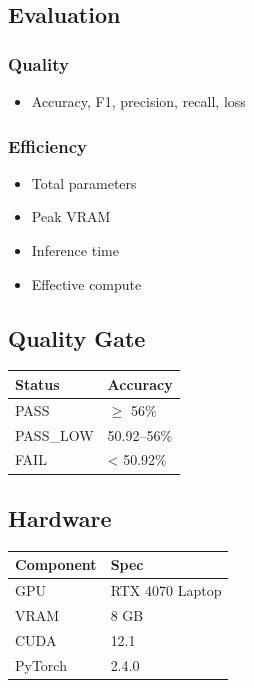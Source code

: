 \subsection{Evaluation}

\subsubsection{Quality}
\begin{itemize}
\item Accuracy, F1, precision, recall, loss

\end{itemize}
\subsubsection{Efficiency}
\begin{itemize}
\item Total parameters
\item Peak VRAM
\item Inference time
\item Effective compute

\end{itemize}
\subsection{Quality Gate}

\begin{table}[H]
\centering
\small
\begin{tabular}{ll}
\toprule
\textbf{Status} & \textbf{Accuracy} \\
\midrule
PASS & $\ge$ 56\% \\
PASS\_LOW & 50.92--56\% \\
FAIL & < 50.92\% \\
\bottomrule
\end{tabular}
\end{table}

\subsection{Hardware}

\begin{table}[H]
\centering
\small
\begin{tabular}{ll}
\toprule
\textbf{Component} & \textbf{Spec} \\
\midrule
GPU & RTX 4070 Laptop \\
VRAM & 8 GB \\
CUDA & 12.1 \\
PyTorch & 2.4.0 \\
\bottomrule
\end{tabular}
\end{table}

